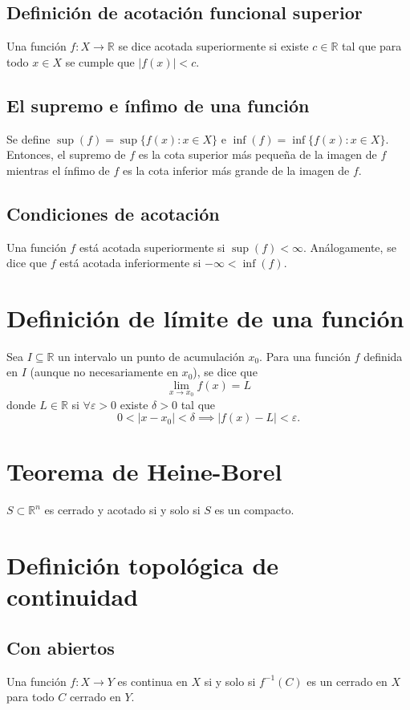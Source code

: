 \documentclass{article}
\begin{document}
\subsection*{Definición de acotación funcional superior}
Una función $f:X\to\mathbb{R}$ se dice acotada superiormente si existe $c\in\mathbb{R}$ tal que para todo $x\in X$ se cumple que $|f(x)|<c$. 

\subsection*{El supremo e ínfimo de una función}
Se define $\sup(f)=\sup\{f(x): x\in X\}$ e $\inf(f)=\inf\{f(x): x\in X\}$. Entonces, el supremo de $f$ es la cota superior más pequeña de la imagen de $f$ mientras el ínfimo de $f$ es la cota inferior más grande de la imagen de $f$.

\subsection*{Condiciones de acotación}
Una función $f$ está acotada superiormente si $\sup(f)<\infty$. Análogamente, se dice que $f$ está acotada inferiormente si $-\infty<\inf(f)$.

\section*{Definición de límite de una función}
Sea $I\subseteq \mathbb{R}$ un intervalo un punto de acumulación $x_0$. Para una función $f$ definida en $I$ (aunque no necesariamente en $x_0$), se dice que 
$$\lim_{x\to x_0}f(x)=L$$
donde $L\in\mathbb{R}$ si $\forall \varepsilon>0$ existe $\delta>0$ tal que
$$0<|x-x_0|<\delta \implies |f(x)-L|<\varepsilon.$$

\section*{Teorema de Heine-Borel}
$S\subset \mathbb{R}^n$ es cerrado y acotado si y solo si $S$ es un compacto.

\section*{Definición topológica de continuidad}

\subsection*{Con abiertos}
Una función $f:X\to Y$ es continua en $X$ si y solo si $f^{-1}(C)$ es un cerrado en $X$ para todo $C$ cerrado en $Y$. 
\end{document}
